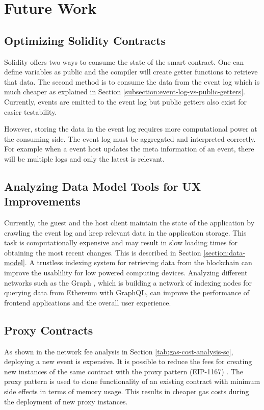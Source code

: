 \chapter{Future Work}

\section{Optimizing Solidity Contracts}
Solidity offers two ways to consume the state of the smart contract. One can define variables as public and the compiler will create getter functions to retrieve that data. The second method is to consume the data from the event log which is much cheaper as explained in Section \ref{subsection:event-log-vs-public-getters}. Currently, events are emitted to the event log but public getters also exist for easier testability.

However, storing the data in the event log requires more computational power at the consuming side. The event log must be aggregated and interpreted correctly. For example when a event host updates the meta information of an event, there will be multiple logs and only the latest is relevant. 

\section{Analyzing Data Model Tools for UX Improvements}
Currently, the guest and the host client maintain the state of the application by crawling the event log and keep relevant data in the application storage. This task is computationally expensive and may result in slow loading times for obtaining the most recent changes. This is described in Section \ref{section:data-model}. A trustless indexing system for retrieving data from the blockchain can improve the usablility for low powered computing devices. Analyzing different networks such as the Graph \cite{the-graph}, which is building a network of indexing nodes for querying data from Ethereum with GraphQL, can improve the performance of frontend applications and the overall user experience.

\section{Proxy Contracts}
As shown in the network fee analysis in Section \ref{tab:gas-cost-analysis-sc}, deploying a new event is expensive. It is possible to reduce the fees for creating new instances of the same contract with the proxy pattern (EIP-1167) \cite{solidity-proxy-pattern}. The proxy pattern is used to clone functionality of an existing contract with minimum side effects in terms of memory usage. This results in cheaper gas costs during the deployment of new proxy instances. 

